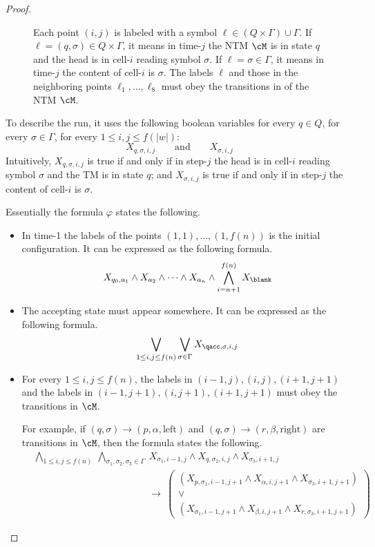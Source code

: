 \documentclass[11pt, a4paper]{article}
\begin{document}
\begin{proof}
\begin{figure}
\caption{Each point $(i,j)$ is labeled with a symbol $\ell\in (Q\times \Gamma) \cup \Gamma$.
If $\ell=(q,\sigma) \in Q\times \Gamma$, it means in time-$j$ the NTM $\cM$ is in state $q$
and the head is in cell-$i$ reading symbol $\sigma$.
If $\ell = \sigma \in \Gamma$, it means in time-$j$ the content of cell-$i$ is $\sigma$.
The labels $\ell$ and those in the neighboring points $\ell_1,\ldots,\ell_8$ must
obey the transitions in of the NTM $\cM$.}
\label{fig:grid}

\end{figure}

To describe the run, it uses the following boolean variables
for every $q\in Q$, for every $\sigma \in \Gamma$,
for every $1\leq i,j \leq f(|w|)$:
$$
X_{q,\sigma,i,j} \qquad \text{and}\qquad X_{\sigma,i,j}
$$
Intuitively, $X_{q,\sigma,i,j}$ is true if and only if
in step-$j$ the head is in cell-$i$ reading symbol $\sigma$ and the TM is in state $q$;
and $X_{\sigma,i,j}$ is true if and only if
in step-$j$ the content of cell-$i$ is $\sigma$.

Essentially the formula $\varphi$ states the following.
\begin{itemize}
\item
In time-1 the labels of the points $(1,1),\ldots,(1,f(n))$ is the initial configuration.
It can be expressed as the following formula.
\begin{equation}
\label{eq:init}
X_{q_0,a_1} \wedge X_{a_2} \wedge \cdots \wedge X_{a_n}
\wedge \bigwedge_{i=n+1}^{f(n)} X_{\blank}
\end{equation}
\item 
The accepting state must appear somewhere.
It can be expressed as the following formula.
\begin{equation}
\label{eq:acc}
\bigvee_{1\leq i,j \leq f(n)}\bigvee_{\sigma\in\Gamma} X_{\qacc,\sigma,i,j}
\end{equation}
\item 
For every $1 \leq i,j \leq f(n)$, the labels in $(i-1,j),(i,j),(i+1,j+1)$
and the labels in $(i-1,j+1),(i,j+1),(i+1,j+1)$ must obey the transitions in $\cM$.

For example, if $(q,\sigma)\to (p,\alpha,\text{left})$ and $(q,\sigma)\to (r,\beta,\text{right})$
are transitions in $\cM$, then the formula states the following.
\begin{align}
\nonumber
&
\bigwedge_{1\leq i,j \leq f(n)}\
\bigwedge_{\sigma_1,\sigma_2,\sigma_3\in \Gamma}\
X_{\sigma_1,i-1,j} \wedge X_{q,\sigma_2,i,j}\wedge X_{\sigma_3,i+1,j}
\\
\label{eq:transition}
&
\hspace{5cm} \to \
\left(
\begin{array}{c}
(X_{p,\sigma_1,i-1,j+1} \wedge X_{\alpha,i,j+1} \wedge X_{\sigma_3,i+1,j+1})
\\
\vee 
\\
(X_{\sigma_1,i-1,j+1} \wedge X_{\beta,i,j+1} \wedge X_{r,\sigma_3,i+1,j+1})
\end{array}
\right)
\end{align}


\end{itemize}
\end{proof}
\end{document}
